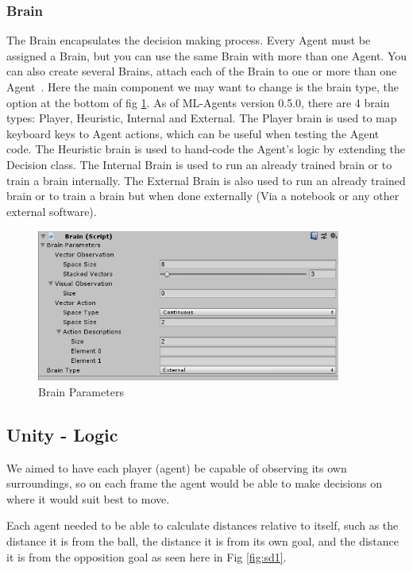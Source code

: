 \subsubsection{Brain}
The Brain encapsulates the decision making process. Every Agent must be assigned a Brain, but you can use the same Brain with more than one Agent. You can also create several Brains, attach each of the Brain to one or more than one Agent~\cite{mlagentBrain}. Here the main component we may want to change is the brain type, the option at the bottom of fig \ref{fig:brain}. As of ML-Agents version 0.5.0, there are 4 brain types: Player, Heuristic, Internal and External.
The Player brain is used to map keyboard keys to Agent actions, which can be useful when testing the Agent code.
The Heuristic brain is used to hand-code the Agent's logic by extending the Decision class. The Internal Brain is used to run an already trained brain or to train a brain internally. The External Brain is also used to run an already trained brain or to train a brain but when done externally (Via a notebook or any other external software).

\begin{figure}[H]
    \centering
    \includegraphics[width=100mm, height=50mm]{img/Brain.PNG}
    \caption{Brain Parameters}
    \label{fig:brain}
\end{figure}


\subsection{Unity - Logic}
\begin{flushleft}
We aimed to have each player (agent) be capable of observing its own surroundings, so on each frame the agent would be able to make decisions on where it would suit best to move.\par
Each agent needed to be able to calculate distances relative to itself, such as the distance it is from the ball, the distance it is from its own goal, and the distance it is from the opposition goal as seen here in Fig \ref{fig:sd1}.
\end{flushleft}

